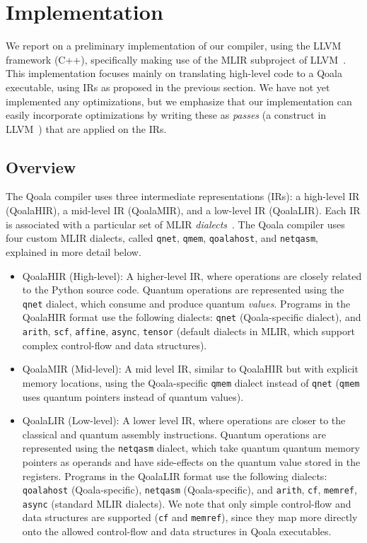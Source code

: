 \section{Implementation}

We report on a preliminary implementation of our compiler, using the LLVM framework (C++), specifically making use of the MLIR subproject of LLVM~\cite{lattner_mlir_2020}.
This implementation focuses mainly on translating high-level code to a Qoala executable, using \acf{IR}s as proposed in the previous section.
We have not yet implemented any optimizations, but we emphasize that our implementation can easily incorporate optimizations by writing these as \emph{passes} (a construct in LLVM~\cite{lattner_llvm_2004}) that are applied on the IRs.

\subsection{Overview}
The Qoala compiler uses three intermediate representations (IRs):
a high-level IR (QoalaHIR), a mid-level IR (QoalaMIR), and a low-level IR (QoalaLIR).
Each IR is associated with a particular set of MLIR \emph{dialects}~\cite{lattner_mlir_2020}.
The Qoala compiler uses four custom MLIR dialects, called \texttt{qnet}, \texttt{qmem}, \texttt{qoalahost}, and \texttt{netqasm}, explained in more detail below.

\begin{itemize}
    \item QoalaHIR (High-level): A higher-level IR, where operations are closely related
    to the Python source code.
    Quantum operations are represented using the \texttt{qnet} dialect, which consume and produce quantum \emph{values}.
    Programs in the QoalaHIR format use the following dialects: \texttt{qnet} (Qoala-specific dialect), and \texttt{arith}, \texttt{scf}, \texttt{affine}, \texttt{async}, \texttt{tensor} (default dialects in MLIR, which support complex control-flow and data structures).
    \item QoalaMIR (Mid-level): A mid level IR, similar to QoalaHIR but with explicit memory locations, using the Qoala-specific \texttt{qmem} dialect instead of \texttt{qnet} (\texttt{qmem} uses quantum pointers instead of quantum values).
    \item QoalaLIR (Low-level): A lower level IR, where operations are closer to the classical and quantum assembly instructions.
    Quantum operations are represented using the \texttt{netqasm} dialect, which take quantum quantum memory pointers as operands and have side-effects on the quantum value stored in the registers.
    Programs in the QoalaLIR format use the following dialects: \texttt{qoalahost} (Qoala-specific), \texttt{netqasm} (Qoala-specific), and \texttt{arith}, \texttt{cf}, \texttt{memref}, \texttt{async} (standard MLIR dialects).
    We note that only simple control-flow and data structures are supported (\texttt{cf} and \texttt{memref}), since they map more directly onto the allowed control-flow and data structures in Qoala executables.
\end{itemize}

